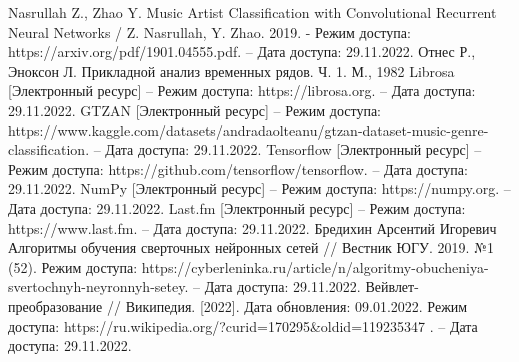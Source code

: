 \begin{thebibliography}{99}
 Nasrullah Z., Zhao Y. Music Artist Classification with Convolutional Recurrent Neural Networks / Z. Nasrullah, Y. Zhao. 2019. - Режим доступа: https://arxiv.org/pdf/1901.04555.pdf. -- Дата доступа: 29.11.2022.
 Отнес Р., Эноксон Л. Прикладной анализ временных рядов. Ч. 1. М., 1982
 Librosa [Электронный ресурс] -- Режим доступа: https://librosa.org. -- Дата доступа: 29.11.2022.
 GTZAN [Электронный ресурс] -- Режим доступа: https://www.kaggle.com/datasets/andradaolteanu/gtzan-dataset-music-genre-classification. -- Дата доступа: 29.11.2022.
 Tensorflow [Электронный ресурс] -- Режим доступа: https://github.com/tensorflow/tensorflow. -- Дата доступа: 29.11.2022.
 NumPy [Электронный ресурс] -- Режим доступа: https://numpy.org. -- Дата доступа: 29.11.2022.
 Last.fm [Электронный ресурс] -- Режим доступа: https://www.last.fm. -- Дата доступа: 29.11.2022.
 Бредихин Арсентий Игоревич Алгоритмы обучения сверточных нейронных сетей // Вестник ЮГУ. 2019. №1 (52). Режим доступа: https://cyberleninka.ru/article/n/algoritmy-obucheniya-svertochnyh-neyronnyh-setey. -- Дата доступа: 29.11.2022.
 Вейвлет-преобразование // Википедия. [2022]. Дата обновления: 09.01.2022. Режим доступа: https://ru.wikipedia.org/?curid=170295\&oldid=119235347 . -- Дата доступа: 29.11.2022.


\end{thebibliography}
